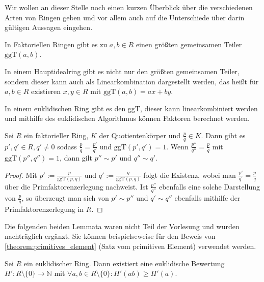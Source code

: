 \begin{remark}
    Wir wollen an dieser Stelle noch einen kurzen Überblick über die verschiedenen Arten von Ringen
    geben und vor allem auch auf die Unterschiede über darin gültigen Aussagen eingehen.

    In Faktoriellen Ringen gibt es zu $a,b\in R$ einen größten gemeinsamen Teiler $\mathrm{ggT}(a,b)$.

    In einem Hauptidealring gibt es nicht nur den größten gemeinsamen Teiler, sondern dieser kann auch als Linearkombination
    dargestellt werden, das heißt für $a,b\in R$ existieren $x,y\in R$ mit $\mathrm{ggT}(a,b)=ax+by$.

    In einem euklidischen Ring gibt es den ggT, dieser kann linearkombiniert werden und mithilfe des euklidischen Algorithmus
    können Faktoren berechnet werden.
\end{remark}

\begin{proposition}
    Sei $R$ ein faktorieller Ring, $K$ der Quotientenkörper und $\frac{p}{q}\in K$. Dann gibt es
    $p',q'\in R, q'\neq 0$ sodass $\frac{p}{q}=\frac{p'}{q'}$ und $\mathrm{ggT}(p',q')=1$. Wenn
    $\frac{p''}{q''}=\frac{p}{q}$ mit $\mathrm{ggT}(p'',q'')=1$, dann gilt $p''\sim p'$ und $q''\sim q'$.
\end{proposition}

\begin{proof}
    Mit $p':=\frac{p}{\mathrm{ggT}(p,q)}$ und $q':=\frac{q}{\mathrm{ggT}(p,q)}$ folgt die Existenz,
    wobei man $\frac{p'}{q'}=\frac{p}{q}$ über die Primfaktorenzerlegung nachweist.
    Ist $\frac{p''}{q''}$ ebenfalls eine solche Darstellung von $\frac{p}{q}$, so überzeugt man sich
    von $p'\sim p''$ und $q'\sim q''$ ebenfalls mithilfe der Primfaktorenzerlegung in $R$.
\end{proof}

\begin{remark}
    Die folgenden beiden Lemmata waren nicht Teil der Vorlesung und wurden nachträglich ergänzt. Sie können beispielseweise für den Beweis von \cref*{theorem:primitives_element} (Satz vom primitiven Element) verwendet werden.
\end{remark}

\begin{lemma}
    Sei $R$ ein euklidischer Ring. Dann existiert eine euklidische Bewertung $H':R\setminus\{0\}\to \mathbb{N}$ mit $\forall a,b\in R\setminus\{0\}:H'(ab)\geq H'(a)$.
\end{lemma}


